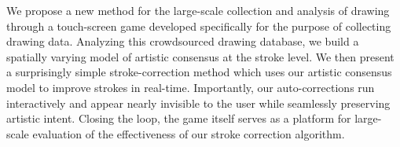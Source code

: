 
We propose a new method for the large-scale collection and analysis
of drawing through a touch-screen game developed specifically for
the purpose of collecting drawing data. Analyzing this crowdsourced
drawing database, we build a spatially varying model of artistic
consensus at the stroke level. We then present a surprisingly simple
stroke-correction method which uses our artistic consensus model to
improve strokes in real-time. Importantly, our auto-corrections run
interactively and appear nearly invisible to the user while
seamlessly preserving artistic intent. Closing the loop, the game
itself serves as a platform for large-scale evaluation of the
effectiveness of our stroke correction algorithm.
